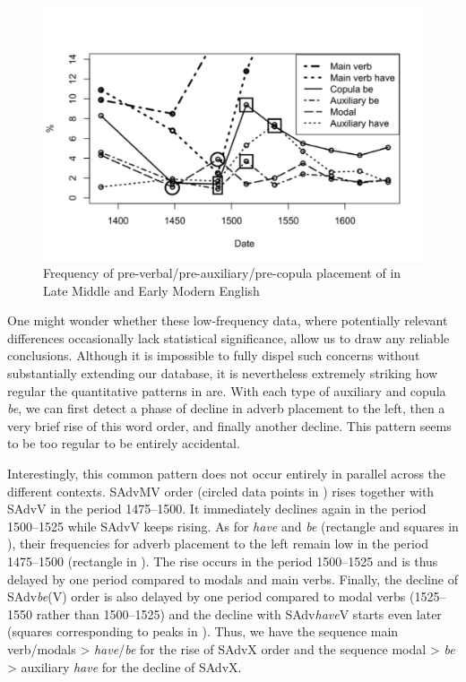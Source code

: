 \documentclass[output=paper]{langsci/langscibook}
\begin{document}
\begin{figure}[htbp]

\caption{Frequency of pre-verbal/pre-auxiliary/pre-copula placement
of  in Late Middle and Early Modern English}\label{fig:key:09.1}

    \centering
    \includegraphics[width=\textwidth]{./img/09-fig1-2.pdf}

\end{figure}

One might wonder whether these low-frequency data, where potentially relevant
differences occasionally lack statistical significance, allow us to draw any
reliable conclusions. Although it is impossible to fully dispel such concerns
without substantially extending our database, it is nevertheless extremely
striking how regular the quantitative patterns in  are. With
each type of auxiliary and copula \emph{be}, we can first detect a phase of
decline in adverb placement to the left, then a very brief rise of this word
order, and finally another decline. This pattern seems to be too regular to be
entirely accidental.

Interestingly, this common pattern does not occur entirely in parallel across
the different contexts. SAdvMV order (circled data points in
) rises together with SAdvV in the period 1475--1500. It
immediately declines again in the period 1500--1525 while SAdvV keeps rising. As
for \emph{have} and \emph{be} (rectangle and squares in
), their frequencies for adverb placement to the left remain
low in the period 1475--1500 (rectangle in ). The rise occurs
in the period 1500--1525 and is thus delayed by one period compared to modals
and main verbs. Finally, the decline of SAdv\emph{be}(V) order is also
delayed by one period compared to modal verbs (1525--1550 rather than 1500--1525)
and the decline with SAdv\emph{have}V starts even later (squares
corresponding to peaks in ). Thus, we have the sequence main
verb/modals > \emph{have}/\emph{be} for the rise of SAdvX order and the
sequence modal > \emph{be} > auxiliary \emph{have} for the decline of
SAdvX.
\end{document}
